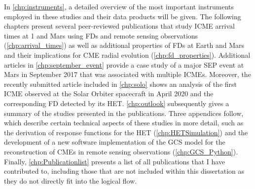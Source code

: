 In \autoref{chp:instruments}, a detailed overview of the most important instruments employed in these studies and their data products will be given. The following chapters present several peer-reviewed publications that study \ac{ICME} arrival times at \SI{1}{\AU} and Mars using \acp{FD} and remote sensing observations (\autoref{chp:arrival_times}) as well as additional properties of \acp{FD} at Earth and Mars and their implications for \ac{CME} radial evolution (\autoref{chp:fd_properties}). Additional articles in \autoref{chp:september_event} provide a case study of a major \ac{SEP} event at Mars in September 2017 that was associated with multiple \acp{ICME}. Moreover, the recently submitted article included in \autoref{chp:solo} shows an analysis of the first \ac{ICME} observed at the Solar Orbiter spacecraft in April 2020 and the corresponding \ac{FD} detected by its \ac{HET}. \autoref{chp:outlook} subsequently gives a summary of the studies presented in the publications. Three appendices follow, which describe certain technical aspects of these studies in more detail, such as the derivation of response functions for the \ac{HET} (\autoref{chp:HETSimulation}) and the development of a new software implementation of the \ac{GCS} model for the reconstruction of \acp{CME} in remote sensing observations (\autoref{chp:GCS_Python}). Finally, \autoref{chp:Publicationlist} presents a list of all publications that I have contributed to, including those that are not included within this dissertation as they do not directly fit into the logical flow.
